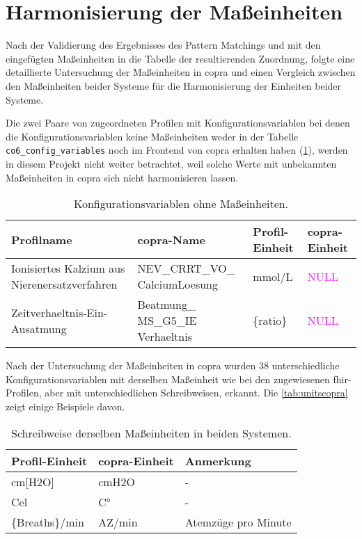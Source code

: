 \section{Harmonisierung der Maßeinheiten} \label{sec:unitscopra}

Nach der Validierung des Ergebnisses des Pattern Matchings und mit den eingefügten Maßeinheiten in die Tabelle der resultierenden Zuordnung, folgte eine detaillierte Untersuchung der Maßeinheiten in \ac{copra} und einen Vergleich zwischen den Maßeinheiten beider Systeme für die Harmonisierung der Einheiten beider Systeme.

Die zwei Paare von zugeordneten Profilen mit Konfigurationsvariablen bei denen die Konfigurationsvariablen keine Maßeinheiten weder in der Tabelle \texttt{co6\_config\_variables} noch im Frontend von \ac{copra} erhalten haben (\ref{tab:nounitscopra}), werden in diesem Projekt nicht weiter betrachtet, weil solche Werte mit unbekannten Maßeinheiten in \ac{copra} sich nicht harmonisieren lassen.

\begin{table}[ht]
	\centering
	\caption[Konfigurationsvariablen ohne Maßeinheiten]{Konfigurationsvariablen ohne Maßeinheiten.}
	\label{tab:nounitscopra}
	\begin{tabular}{|p{3cm}|p{3cm}|l|l|} \hline
		\bfseries Profilname & \bfseries \ac{copra}-Name & \bfseries Profil-Einheit &  \bfseries \ac{copra}-Einheit \\ \hline
		Ionisiertes Kalzium aus Nierenersatzverfahren & NEV\_CRRT\_VO\_ CalciumLoesung & mmol/L & \textcolor{magenta}{NULL} \\ \hline
		Zeitverhaeltnis-Ein-Ausatmung & Beatmung\_ MS\_G5\_IE Verhaeltnis & \{ratio\}  & \textcolor{magenta}{NULL} \\ \hline		
	\end{tabular}
\end{table}

 Nach der Untersuchung der Maßeinheiten in \ac{copra} wurden 38 unterschiedliche Konfigurationsvariablen mit derselben Maßeinheit wie bei den zugewiesenen \ac{fhir}-Profilen, aber mit unterschiedlichen Schreibweisen, erkannt. Die \ref{tab:unitscopra} zeigt einige Beispiele davon.

\begin{table}[ht]
	\centering
	\caption[Schreibweisen derselben Maßeinheiten in beiden Systemen]{Schreibweise derselben Maßeinheiten in beiden Systemen.}
	\label{tab:unitscomii}
	\begin{tabular}{|l|l|l|} \hline
		\bfseries Profil-Einheit & \bfseries \ac{copra}-Einheit & \bfseries Anmerkung \\ \hline
		cm[H2O] & cmH2O & - \\ \hline
		Cel & C° & - \\ \hline
		\{Breaths\}/min & AZ/min & Atemzüge pro Minute \\ \hline
	\end{tabular}
\end{table}

